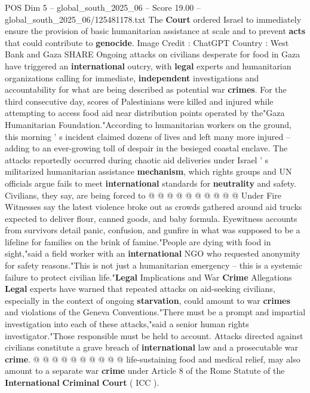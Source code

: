 \begin{textsample}{POS Dim 5 – global\_south\_2025\_06 – Score 19.00 – global\_south\_2025\_06/125481178.txt}  \label{ex:f5_pos_053}
The \textbf{Court} ordered Israel to immediately ensure the provision of basic humanitarian assistance at scale and to prevent \textbf{acts} that could contribute to \textbf{genocide}.
Image Credit : ChatGPT Country : West Bank and Gaza SHARE Ongoing attacks on civilians desperate for food in Gaza have triggered an \textbf{international} outcry, with \textbf{legal} experts and humanitarian organizations calling for immediate, \textbf{independent} investigations and accountability for what are being described as potential war \textbf{crimes}.
For the third consecutive day, scores of Palestinians were killed and injured while attempting to access food aid near distribution points operated by the"Gaza Humanitarian Foundation."According to humanitarian workers on the ground, this morning ' s incident claimed dozens of lives and left many more injured -- adding to an ever-growing toll of despair in the besieged coastal enclave.
The attacks reportedly occurred during chaotic aid deliveries under Israel ' s militarized humanitarian assistance \textbf{mechanism}, which rights groups and UN officials argue fails to meet \textbf{international} standards for \textbf{neutrality} and safety.
Civilians, they say, are being forced to @ @ @ @ @ @ @ @ @ @ Under Fire Witnesses say the latest violence broke out as crowds gathered around aid trucks expected to deliver flour, canned goods, and baby formula.
Eyewitness accounts from survivors detail panic, confusion, and gunfire in what was supposed to be a lifeline for families on the brink of famine."People are dying with food in sight,"said a field worker with an \textbf{international} NGO who requested anonymity for safety reasons."This is not just a humanitarian emergency -- this is a systemic failure to protect civilian life."\textbf{Legal} Implications and War \textbf{Crime} Allegations \textbf{Legal} experts have warned that repeated attacks on aid-seeking civilians, especially in the context of ongoing \textbf{starvation}, could amount to war \textbf{crimes} and violations of the Geneva Conventions."There must be a prompt and impartial investigation into each of these attacks,"said a senior human rights investigator."Those responsible must be held to account.
Attacks directed against civilians constitute a grave breach of \textbf{international} law and a prosecutable war \textbf{crime}. @ @ @ @ @ @ @ @ @ @ life-sustaining food and medical relief, may also amount to a separate war \textbf{crime} under Article 8 of the Rome Statute of the \textbf{International} \textbf{Criminal} \textbf{Court} ( ICC ).

\end{textsample}
